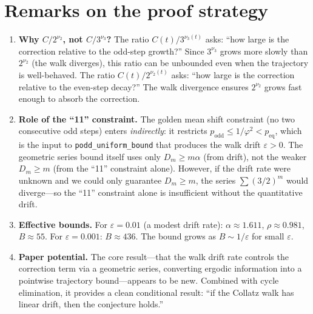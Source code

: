 \documentclass[11pt,a4paper]{article}
\theoremstyle{plain}
\theoremstyle{definition}
\begin{document}
\section{Remarks on the proof strategy}

\begin{enumerate}
  \item \textbf{Why $C/2^{\nu_2}$, not $C/3^{\nu_3}$?}\quad
    The ratio $C(t)/3^{\nu_3(t)}$ asks: ``how large is the correction
    relative to the odd-step growth?''  Since $3^{\nu_3}$ grows more
    slowly than $2^{\nu_2}$ (the walk diverges), this ratio can be
    unbounded even when the trajectory is well-behaved.  The ratio
    $C(t)/2^{\nu_2(t)}$ asks: ``how large is the correction relative
    to the even-step decay?''  The walk divergence ensures $2^{\nu_2}$
    grows fast enough to absorb the correction.

  \item \textbf{Role of the ``11'' constraint.}\quad
    The golden mean shift constraint (no two consecutive odd steps)
    enters \emph{indirectly}: it restricts $p_{\mathrm{odd}} \le
    1/\varphi^2 < p_{\mathrm{eq}}$, which is the input to
    \texttt{podd\_uniform\_bound} that produces the walk drift
    $\varepsilon > 0$.  The geometric series bound itself uses only
    $D_m \ge m\alpha$ (from drift), not the weaker $D_m \ge m$ (from
    the ``11'' constraint alone).  However, if the drift rate were
    unknown and we could only guarantee $D_m \ge m$, the series
    $\sum (3/2)^m$ would diverge---so the ``11'' constraint alone
    is insufficient without the quantitative drift.

  \item \textbf{Effective bounds.}\quad
    For $\varepsilon = 0.01$ (a modest drift rate):
    $\alpha \approx 1.611$, $\rho \approx 0.981$,
    $B \approx 55$.  For $\varepsilon = 0.001$:
    $B \approx 436$.  The bound grows as $B \sim 1/\varepsilon$
    for small $\varepsilon$.

  \item \textbf{Paper potential.}\quad
    The core result---that the walk drift rate controls the correction
    term via a geometric series, converting ergodic information into
    a pointwise trajectory bound---appears to be new.  Combined with
    cycle elimination, it provides a clean conditional result:
    ``if the Collatz walk has linear drift, then the conjecture holds.''
\end{enumerate}
\end{document}
